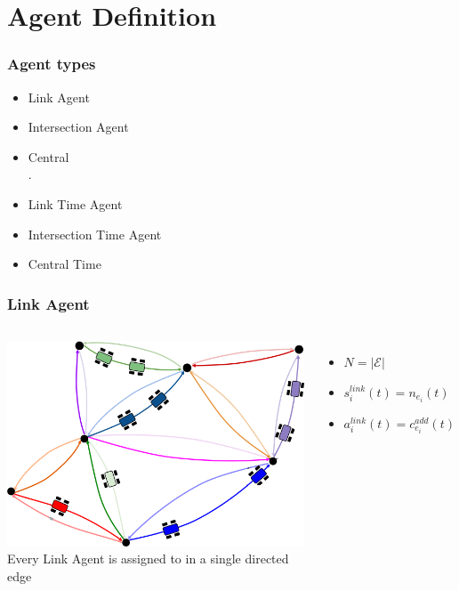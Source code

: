 \documentclass{beamer}
\begin{document}
	\section{Agent Definition}
	\begin{frame}
		\frametitle{Agent types}
		\begin{itemize}
			\item Link Agent
			\item Intersection Agent
			\item Central \\.


			\item Link Time Agent
			\item Intersection Time Agent
			\item Central Time
		\end{itemize}
	\end{frame}
	\begin{frame}
		\frametitle{Link Agent}
		\begin{columns}
			\includegraphics[width=\textwidth]{link.png}
			Every Link Agent is assigned to in a single directed edge
			\begin{itemize}
				\item $N = |\mathcal{E}|$
				\item $s_i^{link}(t) = n_{e_i}(t)$
				\item $a_i^{link}(t) = c_{e_i}^{add}(t)$
			\end{itemize}
		\end{columns}
	\end{frame}
\end{document}
